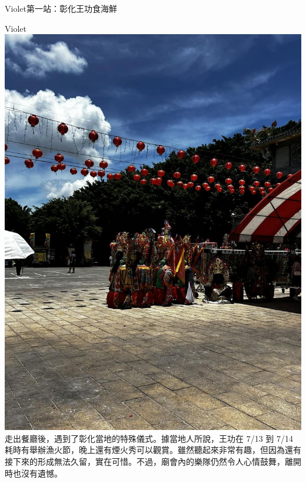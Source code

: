 \documentclass{article}
\begin{document}
\begin{large}
\begin{boxpar}{Violet}{第一站：彰化王功食海鮮}
  \begin{sblock}{Violet}
    \includegraphics[width=\linewidth]{gods.jpg}
\tcblower
  走出餐廳後，遇到了彰化當地的特殊儀式。據當地人所說，王功在 7/13 到 7/14
    耗時有舉辦漁火節，晚上還有煙火秀可以觀賞。雖然聽起來非常有趣，但因為還有接下來的形成無法久留，實在可惜。不過，廟會內的樂隊仍然令人心情鼓舞，離開時也沒有遺憾。
\end{sblock}

\end{boxpar}


\end{large}
\end{document}
